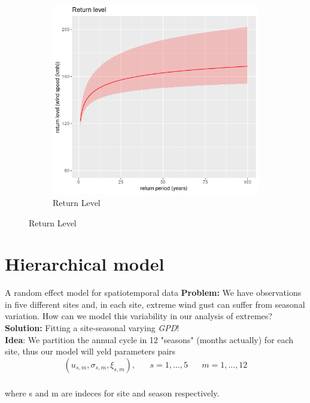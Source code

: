 \documentclass[usenames,dvipsnames]{beamer}
\begin{document}
\begin{frame}
\begin{figure}
\begin{subfigure}[b]{0.4\textwidth}
    \includegraphics[width=\textwidth]{retLevGPD.png}
    \caption{Return Level}
    \label{fig:sub1}
  \end{subfigure}
\end{figure}
     
\end{frame}


\section{Hierarchical model}
\begin{frame}{A random effect model for spatiotemporal data}
\small
\textbf{Problem:} We have observations in five different sites and, in each site, extreme wind gust can suffer from seasonal variation. How can we model this variability in our analysis of extremes? 
\\
\vspace{8pt}
\textbf{Solution:} Fitting a site-seasonal varying \textit{GPD}! 
\\
\vspace{8pt}
\textbf{Idea}: We partition the annual cycle in 12 "seasons" (months actually) for each site, %
thus our model will yeld parameters pairs
\begin{equation*}
(u_{s,m},\sigma_{s,m},\xi_{s,m}), \hspace{20pt} s=1,...,5 \;\;\;  \;\;\; m=1,...,12
\end{equation*}
\frametitle{}
where s and m are indeces for site and season respectively.

\end{frame}
\end{document}
